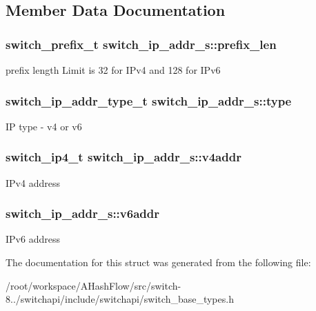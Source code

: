 \subsection{Member Data Documentation}
\hypertarget{structswitch__ip__addr__s_adad36be1af6cffc68bd7bfad575eb5ec}{
\subsubsection[{prefix\+\_\+len}]{\setlength{\rightskip}{0pt plus 5cm}switch\+\_\+prefix\+\_\+t switch\+\_\+ip\+\_\+addr\+\_\+s\+::prefix\+\_\+len}}\label{structswitch__ip__addr__s_adad36be1af6cffc68bd7bfad575eb5ec}
prefix length Limit is 32 for I\+Pv4 and 128 for I\+Pv6 \hypertarget{structswitch__ip__addr__s_ac495e005825ee6fb659c53d0da26c93d}{
\subsubsection[{type}]{\setlength{\rightskip}{0pt plus 5cm}switch\+\_\+ip\+\_\+addr\+\_\+type\+\_\+t switch\+\_\+ip\+\_\+addr\+\_\+s\+::type}}\label{structswitch__ip__addr__s_ac495e005825ee6fb659c53d0da26c93d}
I\+P type -\/ v4 or v6 \hypertarget{structswitch__ip__addr__s_a86348301b627ece114d2f8e1ea3d4ac7}{
\subsubsection[{v4addr}]{\setlength{\rightskip}{0pt plus 5cm}switch\+\_\+ip4\+\_\+t switch\+\_\+ip\+\_\+addr\+\_\+s\+::v4addr}}\label{structswitch__ip__addr__s_a86348301b627ece114d2f8e1ea3d4ac7}
I\+Pv4 address \hypertarget{structswitch__ip__addr__s_a28a4b6fbb750ba21aacff4fd1ec923b4}{
\subsubsection[{v6addr}]{ switch\+\_\+ip\+\_\+addr\+\_\+s\+::v6addr}}\label{structswitch__ip__addr__s_a28a4b6fbb750ba21aacff4fd1ec923b4}
I\+Pv6 address 

The documentation for this struct was generated from the following file\+:\begin{DoxyCompactItemize}
\item 
/root/workspace/\+A\+Hash\+Flow/src/switch-\/8../switchapi/include/switchapi/switch\+\_\+base\+\_\+types.\+h\end{DoxyCompactItemize}
